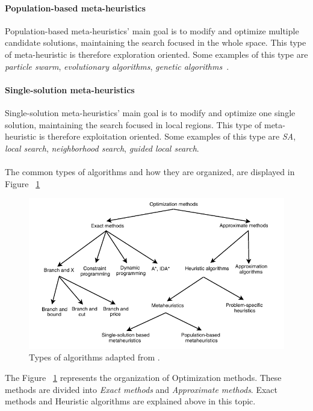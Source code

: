\paragraph{Population-based meta-heuristics}
Population-based meta-heuristics' main goal is to modify and optimize multiple candidate solutions, maintaining the search focused in the whole space. This type of meta-heuristic is therefore exploration oriented. Some examples of this type are \textit{particle swarm}, \textit{evolutionary algorithms}, \textit{genetic algorithms}~\cite{Talbi2009}.\\

\paragraph{Single-solution meta-heuristics}
Single-solution meta-heuristics' main goal is to modify and optimize one single solution, maintaining the search focused in local regions. This type of meta-heuristic is therefore exploitation oriented. Some examples of this type are \textit{SA}, \textit{local search}, \textit{neighborhood search}, \textit{guided local search}\cite{Talbi2009}. \\
\\
The common types of algorithms and how they are organized, are displayed in Figure ~\ref{fig:TypesAlgorithms}

\begin{figure}[h!]
 \centering
   \includegraphics{./images/typesOfAlgorithms}
   \caption{Types of algorithms adapted from \cite{Talbi2009}.}
   \label{fig:TypesAlgorithms}
\end{figure}

The Figure ~\ref{fig:TypesAlgorithms} represents the organization of Optimization methods. These methods are divided into \textit{Exact methods} and \textit{Approximate methods}. Exact methods and Heuristic algorithms are explained above in this topic.

